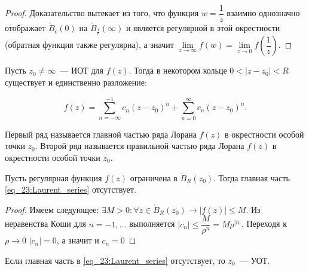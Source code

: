 \begin{proof}
    Доказательство вытекает из того, что функция \(w = \dfrac{1}{z}\) взаимно однозначно отображает
    \(\mathring{B}_\epsilon(0)\) на \(\mathring{B}_{\frac{1}{\epsilon}}(\infty)\) и является 
    регулярной в этой окрестности (обратная функция также регулярна), а значит \(\lim\limits_{z 
    \rightarrow \infty} f(w) = \lim\limits_{z \rightarrow 0} f(\dfrac{1}{z})\).
\end{proof}

Пусть \(z_0 \ne \infty\)~--- ИОТ для \(f(z)\). Тогда в некотором кольце \(0 < |z - z_0| < R\) 
существует и единственно разложение: 

\begin{equation}
f(z) = \sum\limits_{n = -\infty}^{-1} c_n (z-z_0)^n + \sum\limits_{n=0}^{\infty} c_n (z-z_0)^n. 
 \label{eq_23:Laurent_series}
\end{equation}

\begin{definition}
    Первый ряд называется главной частью ряда Лорана \(f(z)\) в окрестности особой точки \(z_0\). 
    Второй ряд называется правильной частью ряда Лорана \(f(z)\) в окрестности особой точки \(z_0\).
\end{definition}

\begin{statement}
    Пусть регулярная функция \(f(z)\) ограничена в \(\mathring{B}_R(z_0)\). Тогда главная часть 
    \eqref{eq_23:Laurent_series} отсутствует.
\end{statement}

\begin{proof}
    Имеем следующее: \(\exists M > 0 \colon \forall z \in \mathring{B}_R(z_0) \rightarrow |f(z)| 
    \le M\). Из неравенства Коши для \(n = -1, \dots\) выполняется \(|c_{n}| \le \dfrac{M}
    {\rho^{n}} = M\rho^{|n|}\). Переходя к \(\rho \rightarrow 0\) \(|c_n| = 0\), а значит и \(c_n
    = 0\)
\end{proof}

\begin{statement}
    Если главная часть в \eqref{eq_23:Laurent_series} отсутствует, то \(z_0\)~--- УОТ.
\end{statement}